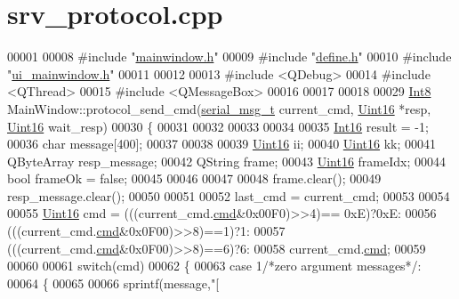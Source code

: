 \hypertarget{a00049_source}{\section{srv\+\_\+protocol.\+cpp}
\label{a00049_source}
}

\begin{DoxyCode}
00001 
00008 \textcolor{preprocessor}{#include "\hyperlink{a00039}{mainwindow.h}"}
00009 \textcolor{preprocessor}{#include "\hyperlink{a00034}{define.h}"}
00010 \textcolor{preprocessor}{#include "\hyperlink{a00052}{ui\_mainwindow.h}"}
00011 
00012 
00013 \textcolor{preprocessor}{#include <QDebug>}
00014 \textcolor{preprocessor}{#include <QThread>}
00015 \textcolor{preprocessor}{#include <QMessageBox>}
00016 
00017 
00018 
00029 \hyperlink{a00001_aafb609548b1aa0152c46f9205b79d0f0}{Int8} MainWindow::protocol\_send\_cmd(\hyperlink{a00001_df/dc8/a00122}{serial\_msg\_t} current\_cmd, 
      \hyperlink{a00001_aae7407b021d43f7193a81a58cfb3e297}{Uint16} *resp, \hyperlink{a00001_aae7407b021d43f7193a81a58cfb3e297}{Uint16} wait\_resp)
00030 \{
00031 
00032 
00033 
00034 
00035    \hyperlink{a00001_a3985266aecb120f269789241c170850c}{Int16}   result = -1;
00036    \textcolor{keywordtype}{char}    message[400];
00037 
00038 
00039    \hyperlink{a00001_aae7407b021d43f7193a81a58cfb3e297}{Uint16}  ii;
00040    \hyperlink{a00001_aae7407b021d43f7193a81a58cfb3e297}{Uint16}  kk;
00041    QByteArray resp\_message;
00042    QString frame;
00043    \hyperlink{a00001_aae7407b021d43f7193a81a58cfb3e297}{Uint16}  frameIdx;
00044    \textcolor{keywordtype}{bool} frameOk = \textcolor{keyword}{false};
00045 
00046 
00047 
00048    frame.clear();
00049    resp\_message.clear();
00050 
00051 
00052    last\_cmd = current\_cmd;
00053 
00054 
00055    \hyperlink{a00001_aae7407b021d43f7193a81a58cfb3e297}{Uint16} cmd = (((current\_cmd.\hyperlink{a00001_af20664dc9ca2b752c73d524edee0e07a}{cmd}&0x00F0)>>4)== 0xE)?0xE:
00056                 (((current\_cmd.\hyperlink{a00001_af20664dc9ca2b752c73d524edee0e07a}{cmd}&0x0F00)>>8)==1)?1:
00057                 (((current\_cmd.\hyperlink{a00001_af20664dc9ca2b752c73d524edee0e07a}{cmd}&0x0F00)>>8)==6)?6:            
00058                 current\_cmd.\hyperlink{a00001_af20664dc9ca2b752c73d524edee0e07a}{cmd};
00059 
00060 
00061  \textcolor{keywordflow}{switch}(cmd)
00062    \{
00063        \textcolor{keywordflow}{case} 1\textcolor{comment}{/*zero argument messages*/}:
00064        \{
00065 
00066        sprintf(message,\textcolor{stringliteral}{"[%
}
\end{DoxyCode}
